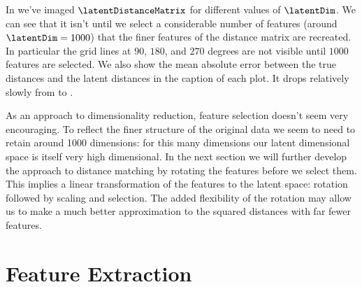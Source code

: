 In
 we've imaged
$\latentDistanceMatrix$ for different values of $\latentDim$. We can
see that it isn't until we select a considerable number of features
(around $\latentDim=1000$) that the finer features of the distance
matrix are recreated. In particular the grid lines at $90$, $180$, and
$270$ degrees are not visible until $1000$ features are selected. We
also show the mean absolute error between the true distances and the
latent distances in the caption of each plot. It drops relatively
slowly from \errorVal{ }to \errorVal.

As an approach to dimensionality reduction, feature selection doesn't
seem very encouraging. To reflect the finer structure of the original
data we seem to need to retain around 1000 dimensions: for this many
dimensions our latent dimensional space is itself very high
dimensional. In the next section we will further develop the approach
to distance matching by rotating the features before we select
them. This implies a linear transformation of the features to the
latent space: rotation followed by scaling and selection. The added
flexibility of the rotation may allow us to make a much better
approximation to the squared distances with far fewer features.

\section{Feature Extraction}

